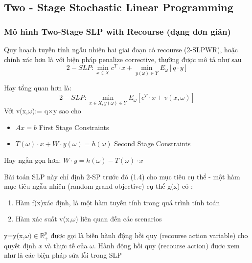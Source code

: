 \documentclass[a4paper]{article}
\begin{document}
\subsection{Two - Stage Stochastic Linear Programming }
\subsubsection{Mô hình Two-Stage SLP with Recourse (dạng đơn giản)}
{Quy hoạch tuyến tính ngẫu nhiên hai giai đoạn có recourse (2-SLPWR), hoặc chính
xác hơn là với biện pháp penalize corrective, thường được mô tả như sau}
\[2-SLP:  \min\limits_{x \in X}{c^T \cdot x} + \min\limits_{y(\omega) \in Y}{E_\omega[q \cdot y]}\]

{Hay tổng quan hơn là:}
\[2-SLP:  \min\limits_{x \in X, y(\omega)\in Y}{E_\omega[c^T \cdot x + v(x, \omega)]}\]
{Với v(x,$\omega$):= q$\times$y sao cho}
\begin{itemize}
    \item $Ax = b$ First Stage Constraints
    \item $T(\omega) \cdot x + W \cdot y(\omega) = h(\omega)$ Second Stage Constraints
\end{itemize}
{Hay ngắn gọn hơn: $W \cdot y = h(\omega) - T(\omega) \cdot x$}

{Bài toán SLP này chỉ định 2-SP trước đó (1.4) cho mục tiêu cụ thể - một hàm mục tiêu ngẫu nhiên (random grand objective) cụ thể g(x) có :}
\begin{enumerate}
    \item Hàm f(x)xác định, là một hàm tuyến tính trong quá trình tính toán
    \item Hàm xác suất v(x,$\omega$) liên quan đến các scenarios 
\end{enumerate}

{y=y(x,$\omega) \in \mathbb{R}_+^p$ được gọi là biến hành động hồi quy (recourse action variable) cho quyết định $x$ và thực tế của $\omega$. Hành động hồi quy (recourse action) được xem như là các biện pháp sửa lỗi trong SLP}

{}
\end{document}
